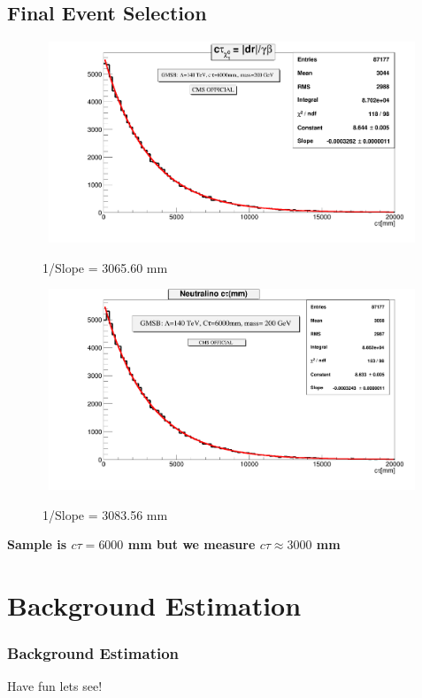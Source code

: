 \documentclass{beamer}
\begin{document}
\begin{frame}
\subsection{Final Event Selection}
\begin{figure}[ht]
\begin{minipage}[b]{0.45\linewidth}
\centering
\mbox{
\includegraphics[height=6cm,width=\textwidth]{Dist_TravDL.png}}
\vspace{-1cm}
\caption{1/Slope = 3065.60 mm }
\label{fig:Neutralino Distance}
\end{minipage}
\hspace{0.1cm}
\begin{minipage}[b]{0.45\linewidth}
\centering
\mbox{
\includegraphics[height=6cm, width=\textwidth]{MC_TimeDL.png}}
\vspace{-1cm}
\caption{1/Slope = 3083.56 mm }
\label{fig:From_MC}
\end{minipage}
\end{figure}
\vspace{-1cm}
\alert{\textbf{Sample is $c\tau= 6000$ mm but we measure $c\tau \approx 3000$ mm}}
\end{frame}
\section{Background Estimation}
\begin{frame}
\frametitle{\Huge Background Estimation}
Have fun lets see!
\end{frame}
\end{document}
